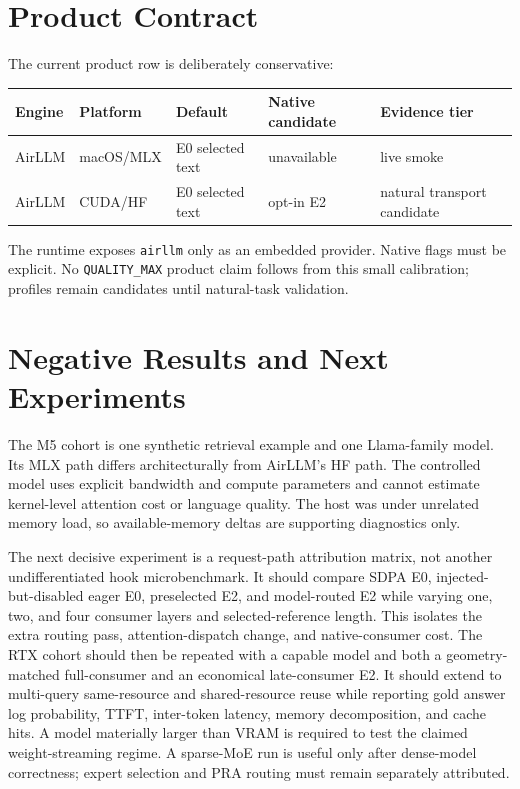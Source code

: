 \documentclass[10pt]{article}
\begin{document}
\section{Product Contract}

The current product row is deliberately conservative:
\begin{center}
\small
\begin{tabular}{lllll}
\toprule
Engine & Platform & Default & Native candidate & Evidence tier \\
\midrule
AirLLM & macOS/MLX & E0 selected text & unavailable & live smoke \\
AirLLM & CUDA/HF & E0 selected text & opt-in E2 & natural transport candidate \\
\bottomrule
\end{tabular}
\end{center}
The runtime exposes \texttt{airllm} only as an embedded provider. Native flags
must be explicit. No \texttt{QUALITY\_MAX} product claim follows from this
small calibration; profiles remain candidates until natural-task validation.

\section{Negative Results and Next Experiments}

The M5 cohort is one synthetic retrieval example and one Llama-family model.
Its MLX path differs architecturally from AirLLM's HF path. The controlled model
uses explicit bandwidth and compute parameters and cannot estimate kernel-level
attention cost or language quality. The host was under unrelated memory load,
so available-memory deltas are supporting diagnostics only.

The next decisive experiment is a request-path attribution matrix, not another
undifferentiated hook microbenchmark. It should compare SDPA E0,
injected-but-disabled eager E0, preselected E2, and model-routed E2 while varying
one, two, and four consumer layers and selected-reference length. This isolates
the extra routing pass, attention-dispatch change, and native-consumer cost. The
RTX cohort should then be repeated with a capable model and both a
geometry-matched full-consumer and an economical late-consumer E2. It should
extend to multi-query same-resource and shared-resource reuse while reporting
gold answer log probability, TTFT, inter-token latency, memory decomposition,
and cache hits. A model materially larger than VRAM is required to test the claimed
weight-streaming regime. A sparse-MoE run is useful only after dense-model
correctness; expert selection and PRA routing must remain separately
attributed.
\end{document}
